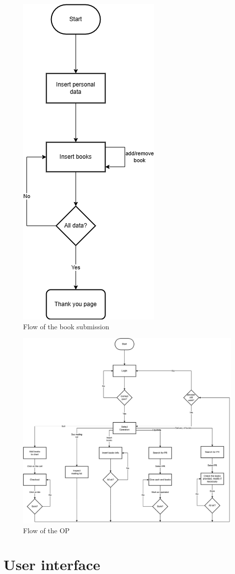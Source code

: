 \begin{figure}[ht]
    \centering
    \includegraphics[width=.25\textwidth]{assets/flow_book_submission.png}
    \caption{Flow of the book submission}
    \label{fig:flow_book_submission}
\end{figure}

\begin{figure}[ht]
    \centering
    \includegraphics[width=\textwidth]{assets/flow_op.png}
    \caption{Flow of the OP}
    \label{fig:flow_op}
\end{figure}

\section{User interface}
\label{sec:ui}

